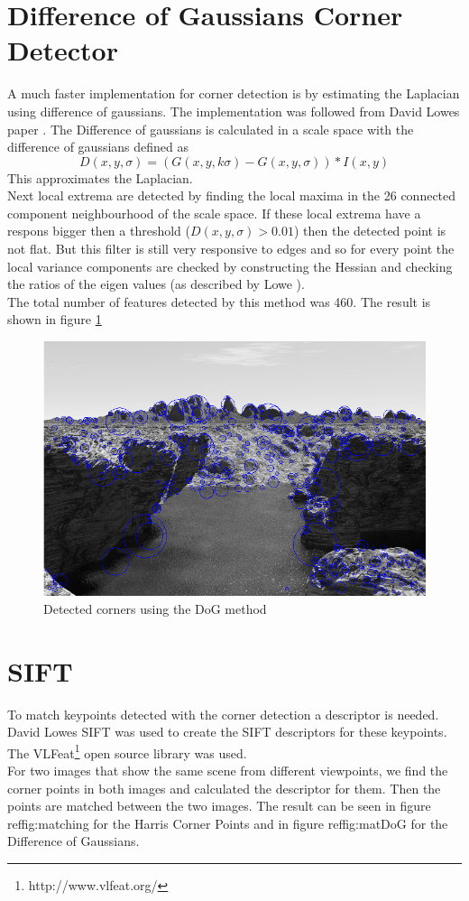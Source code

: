 \documentclass{article}
\begin{document}
\section{Difference of Gaussians Corner Detector}

A much faster implementation for corner detection is by estimating the Laplacian using difference of gaussians. The implementation was followed from David Lowes paper \cite{Lowe}. The Difference of gaussians is calculated in a scale space with the difference of gaussians defined as
\begin{equation}
D(x,y,\sigma) = (G(x,y,k\sigma) - G(x,y,\sigma)) * I(x,y)
\end{equation}
This approximates the Laplacian.\\
Next local extrema are detected by finding the local maxima in the 26 connected component neighbourhood of the scale space. If these local extrema have a respons bigger then a threshold ($D(x,y,\sigma) > 0.01$) then the detected point is not flat. But this filter is still very responsive to edges and so for every point the local variance components are checked by constructing the Hessian and checking the ratios of the eigen values (as described by Lowe \cite{Lowe}).\\
The total number of features detected by this method was 460. The result is shown in figure \ref{fig:DoG}

\begin{figure}[ht]
\centering
\includegraphics[width=\textwidth]{img/DoG.png}
\caption{Detected corners using the DoG method}
\label{fig:DoG}
\end{figure}

\section{SIFT}
To match keypoints detected with the corner detection a descriptor is needed. David Lowes SIFT was used to create the SIFT descriptors for these keypoints. The VLFeat\footnote{http://www.vlfeat.org/} open source library was used. \\
For two images that show the same scene from different viewpoints, we find the corner points in both images and calculated the descriptor for them. Then the points are matched between the two images. The result can be seen in figure ref{fig:matching} for the Harris Corner Points and in figure ref{fig:matDoG} for the Difference of Gaussians.

{}

\end{document}
